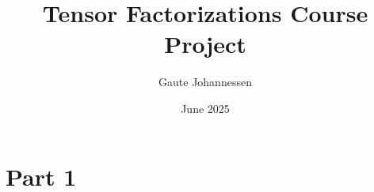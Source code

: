 \documentclass[10pt]{article}
\title{Tensor Factorizations Course Project}
\author{Gaute Johannessen}
\date{June 2025}
\begin{document}
\maketitle
\section{Part 1}


\end{document}
